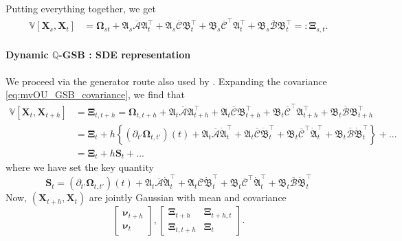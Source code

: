 \documentclass{article}
\newcommand{\V}{\mathbb{V}}
\newcommand{\Ac}{\mathcal{A}}
\newcommand{\Bc}{\mathcal{B}}
\newcommand{\Cc}{\mathcal{C}}
\newcommand{\bmathfrak}[1]{\bm{\mathfrak{#1}}}
\theoremstyle{newstyle}
\begin{document}
Putting everything together, we get
\begin{align}
  \V[\bm{X}_s, \bm{X}_t] &= \bm{\Omega}_{st} + \bmathfrak{A}_s \bm{\overline{\Ac}} \bmathfrak{A}_t^\top + \bmathfrak{A}_s \bm{\overline{\Cc}} \bmathfrak{B}_t^\top + \bmathfrak{B}_s \bm{\overline{\Cc}}^\top \bmathfrak{A}_t^\top + \bmathfrak{B}_s \bm{\overline{\Bc}} \bmathfrak{B}_t^\top =: \bm{\Xi}_{s, t}.  \label{eq:mvOU_GSB_covariance}
\end{align}

\paragraph{Dynamic $\mathbb{Q}$-GSB : SDE representation}
We proceed via the generator route also used by \cite{bunne2023schrodinger}. Expanding the covariance \eqref{eq:mvOU_GSB_covariance}, we find that 
\begin{align}
  \V[\bm{X}_t, \bm{X}_{t + h}] &= \bm{\Xi}_{t, t+h} = \bm{\Omega}_{t, t+h} + \bmathfrak{A}_t \bm{\overline{\Ac}} \bmathfrak{A}_{t+h}^\top + \bmathfrak{A}_t \bm{\overline{\Cc}} \bmathfrak{B}_{t+h}^\top + \bmathfrak{B}_t \bm{\overline{\Cc}}^\top \bmathfrak{A}_{t+h}^\top + \bmathfrak{B}_t \bm{\overline{\Bc}} \bmathfrak{B}_{t+h}^\top \\
                               &= \bm{\Xi}_t + h \left\{ (\partial_{t'} \bm{\Omega}_{t, t'})(t) + \bmathfrak{A}_t \bm{\overline{\Ac}} \dot{\bmathfrak{A}}_t^\top + \bmathfrak{A}_t \bm{\overline{\Cc}} \dot{\bmathfrak{B}}_t^\top + \bmathfrak{B}_t \bm{\overline{\Cc}}^\top \dot{\bmathfrak{A}}_t^\top + \bmathfrak{B}_t \bm{\overline{\Bc}} \dot{\bmathfrak{B}}_t^\top \right\} + ... \\
                               &= \bm{\Xi}_t + h \bm{S}_t + ... 
\end{align}
where we have set the key quantity
\begin{equation}
  \bm{S}_t = (\partial_{t'} \bm{\Omega}_{t, t'})(t) + \bmathfrak{A}_t \bm{\overline{\Ac}} \dot{\bmathfrak{A}}_t^\top + \bmathfrak{A}_t \bm{\overline{\Cc}} \dot{\bmathfrak{B}}_t^\top + \bmathfrak{B}_t \bm{\overline{\Cc}}^\top \dot{\bmathfrak{A}}_t^\top + \bmathfrak{B}_t \bm{\overline{\Bc}} \dot{\bmathfrak{B}}_t^\top
\end{equation}
Now, $(\bm{X}_{t+h}, \bm{X}_t)$ are jointly Gaussian with mean and covariance
\begin{equation}
  \begin{bmatrix} \bm{\nu}_{t+h} \\ \bm{\nu}_t \end{bmatrix}, 
  \begin{bmatrix} \bm{\Xi}_{t+h} & \bm{\Xi}_{t+h, t} \\ \bm{\Xi}_{t, t+h} & \bm{\Xi}_t \end{bmatrix}. 
\end{equation}
\end{document}
